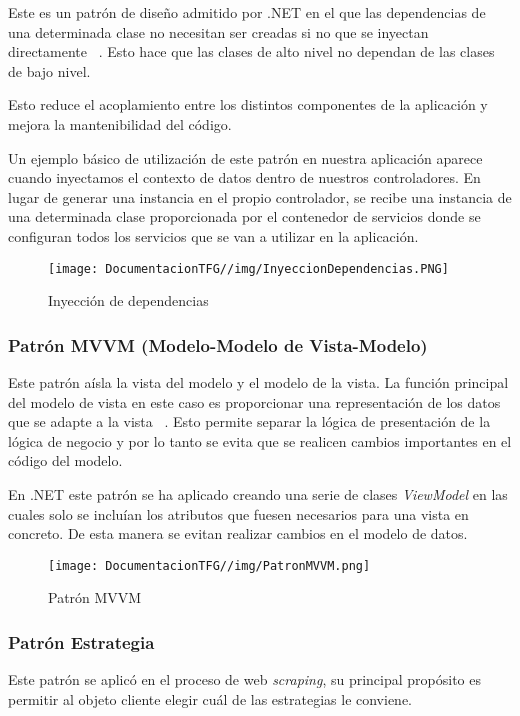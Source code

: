 Este es un patrón de diseño admitido por .NET en el que las dependencias de una determinada clase no necesitan ser creadas si no que se inyectan directamente ~\cite{inyecciondependencias:latex}. Esto hace que las clases de alto nivel no dependan de las clases de bajo nivel.

Esto reduce el acoplamiento entre los distintos componentes de la aplicación y mejora la mantenibilidad del código.

Un ejemplo básico de utilización de este patrón en nuestra aplicación aparece cuando inyectamos el contexto de datos dentro de nuestros controladores. En lugar de generar una instancia en el propio controlador, se recibe una instancia de una determinada clase proporcionada por el contenedor de servicios donde se configuran todos los servicios que se van a utilizar en la aplicación.

\begin{figure}[H]
    \centering
    \texttt{[image: DocumentacionTFG//img/InyeccionDependencias.PNG]}
    \caption{Inyección de dependencias}
\end{figure}

\subsubsection{Patrón MVVM (Modelo-Modelo de Vista-Modelo)}

Este patrón aísla la vista del modelo y el modelo de la vista. La función principal del modelo de vista en este caso es proporcionar una representación de los datos que se adapte a la vista ~\cite{patronmvvm:latex}. Esto permite separar la lógica de presentación de la lógica de negocio y por lo tanto se evita que se realicen cambios importantes en el código del modelo.

En .NET este patrón se ha aplicado creando una serie de clases \textit{ViewModel} en las cuales solo se incluían los atributos que fuesen necesarios para una vista en concreto. De esta manera se evitan realizar cambios en el modelo de datos.

\begin{figure}[H]
    \centering
    \texttt{[image: DocumentacionTFG//img/PatronMVVM.png]}
    \caption{Patrón MVVM}
\end{figure}

\subsubsection{Patrón Estrategia}
Este patrón se aplicó en el proceso de web \textit{scraping}, su principal propósito es permitir al objeto cliente elegir cuál de las estrategias le conviene.

